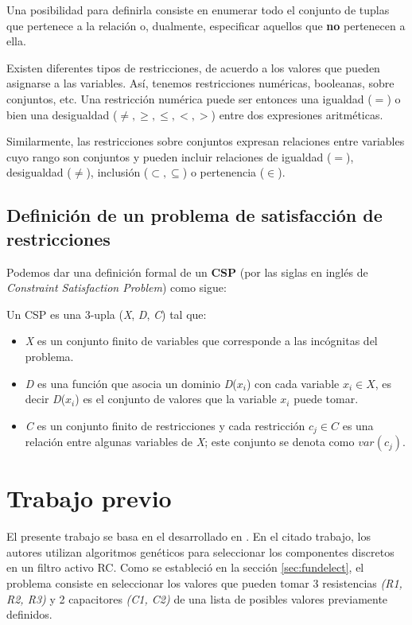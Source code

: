 \documentclass{llncs}
\begin{document}
      Una posibilidad para definirla consiste en enumerar todo el conjunto de tuplas que pertenece a la relaci\'on o,
      dualmente, especificar aquellos que \textbf{no} pertenecen a ella.
      
      Existen diferentes tipos de restricciones, de acuerdo a los valores que pueden asignarse a las variables. As\'i,
      tenemos restricciones num\'ericas, booleanas, sobre conjuntos, etc. Una restricci\'on num\'erica puede ser entonces
      una igualdad ($=$) o bien una desigualdad ($\neq, \geq, \leq, <, >$) entre dos expresiones aritm\'eticas.
      
      Similarmente, las restricciones sobre conjuntos expresan relaciones entre variables cuyo rango son conjuntos y pueden
      incluir relaciones de igualdad ($=$), desigualdad ($\neq$), inclusi\'on ($\subset, \subseteq$) o pertenencia ($\in$).
      
    \subsection{Definici\'on de un problema de satisfacci\'on de restricciones}
      Podemos dar una definici\'on formal de un \textbf{CSP} (por las siglas en ingl\'es de \textit{Constraint
      Satisfaction Problem}) como sigue:
      
      Un CSP es una 3-upla (\textit{X}, \textit{D}, \textit{C}) tal que:
      \begin{itemize}
        \item \textit{X} es un conjunto finito de variables que corresponde a las inc\'ognitas del problema.
        \item \textit{D} es una funci\'on que asocia un dominio \textit{D}($x_i$) con cada variable $x_i \in \textit{X}$, es
        decir \textit{D}($x_i$) es el conjunto de valores que la variable $x_i$ puede tomar.
        \item \textit{C} es un conjunto finito de restricciones y cada restricci\'on $c_j \in C$ es una relaci\'on entre
        algunas variables de \textit{X}; este conjunto se denota como $var(c_j).$
      \end{itemize}
      
    
  \section{\textbf{Trabajo previo}}
    \label{sec:previouswork}
    El presente trabajo se basa en el desarrollado en \cite{lov:rom:per}. En el citado trabajo, los autores
    utilizan algoritmos gen\'eticos para seleccionar los componentes discretos en un filtro activo RC. Como se
    estableci\'o en la secci\'on \ref{sec:fundelect}, el problema consiste en seleccionar los valores que pueden
    tomar 3 resistencias \textit{(R1, R2, R3)} y 2 capacitores \textit{(C1, C2)} de una lista de posibles valores
    previamente definidos.
    
\end{document}
